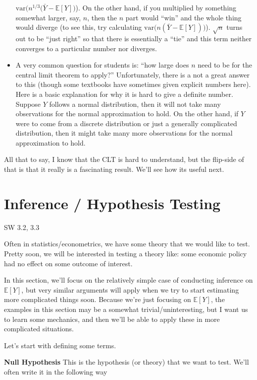 \documentclass[
  letterpaper,
  DIV=11,
  numbers=noendperiod]{scrreprt}
\begin{document}
\begin{itemize}
  \(\mathrm{var}\Big(n^{1/3}(\bar{Y} - \mathbb{E}[Y]\Big)\)). On the
  other hand, if you multiplied by something somewhat larger, say,
  \(n\), then the \(n\) part would ``win'' and the whole thing would
  diverge (to see this, try calculating
  \(\mathrm{var}\Big(n(\bar{Y}-\mathbb{E}[Y])\Big)\)). \(\sqrt{n}\)
  turns out to be ``just right'' so that there is essentially a ``tie''
  and this term neither converges to a particular number nor diverges.
\item
  A very common question for students is: ``how large does \(n\) need to
  be for the central limit theorem to apply?'' Unfortunately, there is a
  not a great answer to this (though some textbooks have sometimes given
  explicit numbers here). Here is a basic explanation for why it is hard
  to give a definite number. Suppose \(Y\) follows a normal
  distribution, then it will not take many observations for the normal
  approximation to hold. On the other hand, if \(Y\) were to come from a
  discrete distribution or just a generally complicated distribution,
  then it might take many more observations for the normal approximation
  to hold.
\end{itemize}

All that to say, I know that the CLT is hard to understand, but the
flip-side of that is that it really is a fascinating result. We'll see
how its useful next.

\section{Inference / Hypothesis
Testing}\label{inference-hypothesis-testing}

SW 3.2, 3.3

Often in statistics/econometrics, we have some theory that we would like
to test. Pretty soon, we will be interested in testing a theory like:
some economic policy had no effect on some outcome of interest.

In this section, we'll focus on the relatively simple case of conducting
inference on \(\mathbb{E}[Y]\), but very similar arguments will apply
when we try to start estimating more complicated things soon. Because
we're just focusing on \(\mathbb{E}[Y]\), the examples in this section
may be a somewhat trivial/uninteresting, but I want us to learn some
mechanics, and then we'll be able to apply these in more complicated
situations.

Let's start with defining some terms.

\textbf{Null Hypothesis} This is the hypothesis (or theory) that we want
to test. We'll often write it in the following way
\end{document}
